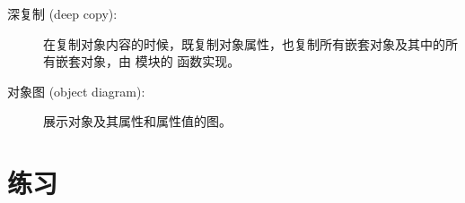 \begin{description}

\item[深复制 (deep copy):]在复制对象内容的时候，既复制对象属性，也复制所有嵌套对象及其中的所有嵌套对象，由  模块的  函数实现。


\item[对象图 (object diagram):]
展示对象及其属性和属性值的图。
  

\end{description}


\section{练习}

